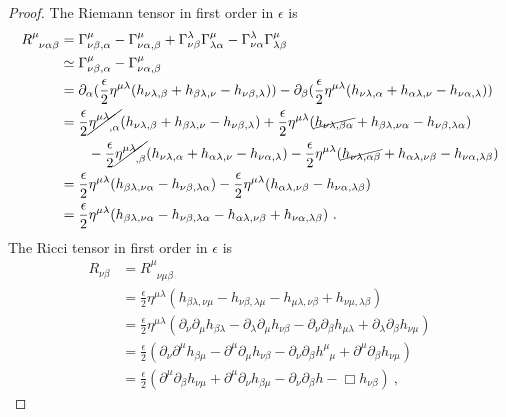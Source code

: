\begin{proof}
        The Riemann tensor in first order in $\epsilon$ is 
        \begin{equation*}
        \begin{aligned}
            R^\mu_{\phantom \mu \nu\alpha\beta} & = \Gamma^\mu_{\nu\beta,\alpha} - \Gamma^\mu_{\nu\alpha,\beta} + \Gamma^\lambda_{\nu\beta} \Gamma^\mu_{\lambda\alpha} - \Gamma^\lambda_{\nu\alpha} \Gamma^\mu_{\lambda\beta} \\ & \simeq \Gamma^\mu_{\nu\beta,\alpha} - \Gamma^\mu_{\nu\alpha,\beta} \\ & = \partial_\alpha (\frac{\epsilon}{2} \eta^{\mu\lambda} (h_{\nu\lambda, \beta} + h_{\beta\lambda,\nu} - h_{\nu\beta,\lambda}) ) - \partial_\beta (\frac{\epsilon}{2} \eta^{\mu\lambda} (h_{\nu\lambda, \alpha} + h_{\alpha\lambda,\nu} - h_{\nu\alpha,\lambda})) \\ & = \frac{\epsilon}{2} \cancel{\eta^{\mu\lambda}_{\phantom{\mu\lambda} , \alpha}} (h_{\nu\lambda, \beta} + h_{\beta\lambda,\nu} - h_{\nu\beta,\lambda}) + \frac{\epsilon}{2} \eta^{\mu\lambda} (\cancel{h_{\nu\lambda, \beta\alpha}} + h_{\beta\lambda,\nu\alpha} - h_{\nu\beta,\lambda\alpha}) \\ & \qquad - \frac{\epsilon}{2} \cancel{\eta^{\mu\lambda}_{\phantom{\mu\lambda} , \beta}} (h_{\nu\lambda, \alpha} + h_{\alpha\lambda,\nu} - h_{\nu\alpha,\lambda}) - \frac{\epsilon}{2} \eta^{\mu\lambda} (\cancel{h_{\nu\lambda, \alpha\beta}} + h_{\alpha\lambda,\nu\beta} - h_{\nu\alpha,\lambda\beta}) \\ & = \frac{\epsilon}{2} \eta^{\mu\lambda} (h_{\beta\lambda,\nu\alpha} - h_{\nu\beta,\lambda\alpha}) - \frac{\epsilon}{2} \eta^{\mu\lambda} (h_{\alpha\lambda,\nu\beta} - h_{\nu\alpha,\lambda\beta}) \\ & = \frac{\epsilon}{2} \eta^{\mu\lambda} (h_{\beta\lambda,\nu\alpha} - h_{\nu\beta,\lambda\alpha} - h_{\alpha\lambda,\nu\beta} + h_{\nu\alpha,\lambda\beta}) ~.
        \end{aligned}
        \end{equation*}
        The Ricci tensor in first order in $\epsilon$ is 
        \begin{equation*}
        \begin{aligned}
            R_{\nu\beta} & = R^\mu_{\phantom \mu \nu\mu\beta} \\ & = \frac{\epsilon}{2} \eta^{\mu\lambda} ( h_{\beta\lambda,\nu\mu} - h_{\nu\beta,\lambda\mu} - h_{\mu\lambda,\nu\beta} + h_{\nu\mu,\lambda\beta}) \\ & = \frac{\epsilon}{2} \eta^{\mu\lambda} (\partial_\nu \partial_\mu h_{\beta\lambda} - \partial _\lambda \partial_\mu h_{\nu\beta} - \partial_\nu \partial_\beta h_{\mu\lambda} + \partial_\lambda \partial_\beta h_{\nu\mu}) \\ & = \frac{\epsilon}{2} (\partial_\nu \partial^\mu h_{\beta\mu} - \partial^\mu \partial_\mu h_{\nu\beta} - \partial_\nu \partial_\beta h^\mu_{\phantom \mu \mu} + \partial^\mu \partial_\beta h_{\nu\mu}) \\ & = \frac{\epsilon}{2} (  \partial^\mu \partial_\beta h_{\nu\mu} + \partial^\mu \partial_\nu h_{\beta\mu} - \partial_\nu \partial_\beta h - \Box h_{\nu\beta} ) ~,

\end{aligned}
\end{equation*}
\end{proof}

